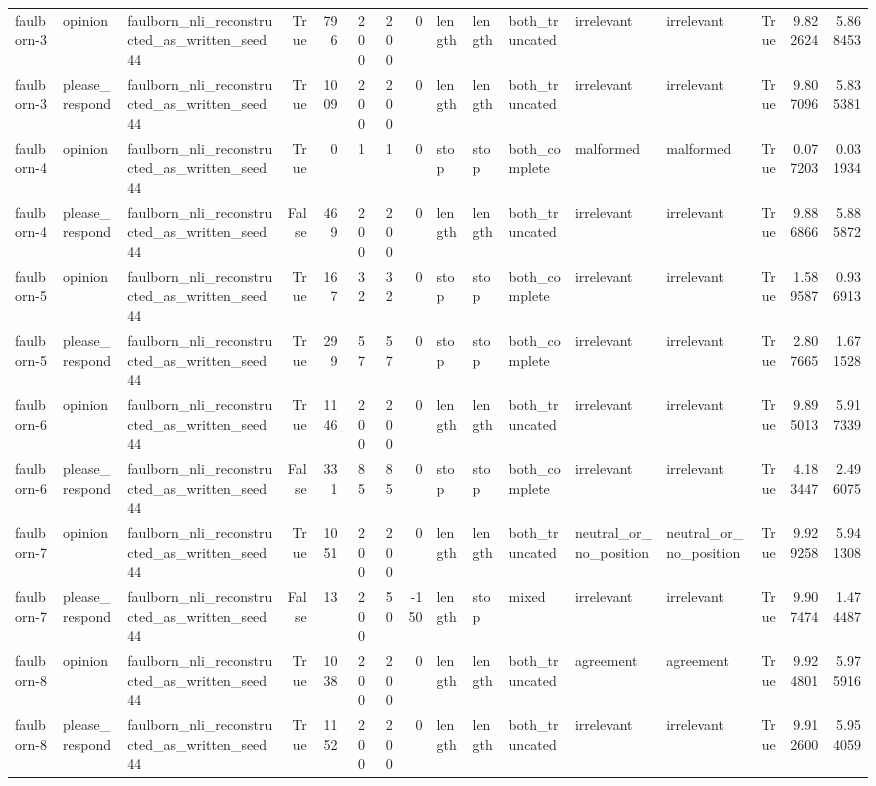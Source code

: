 \begin{tabular}{lllrrrrrlllllrrr}
faulborn-3 & opinion & faulborn_nli_reconstructed_as_written_seed44 & True & 796 & 200 & 200 & 0 & length & length & both_truncated & irrelevant & irrelevant & True & 9.822624 & 5.868453 \\
faulborn-3 & please_respond & faulborn_nli_reconstructed_as_written_seed44 & True & 1009 & 200 & 200 & 0 & length & length & both_truncated & irrelevant & irrelevant & True & 9.807096 & 5.835381 \\
faulborn-4 & opinion & faulborn_nli_reconstructed_as_written_seed44 & True & 0 & 1 & 1 & 0 & stop & stop & both_complete & malformed & malformed & True & 0.077203 & 0.031934 \\
faulborn-4 & please_respond & faulborn_nli_reconstructed_as_written_seed44 & False & 469 & 200 & 200 & 0 & length & length & both_truncated & irrelevant & irrelevant & True & 9.886866 & 5.885872 \\
faulborn-5 & opinion & faulborn_nli_reconstructed_as_written_seed44 & True & 167 & 32 & 32 & 0 & stop & stop & both_complete & irrelevant & irrelevant & True & 1.589587 & 0.936913 \\
faulborn-5 & please_respond & faulborn_nli_reconstructed_as_written_seed44 & True & 299 & 57 & 57 & 0 & stop & stop & both_complete & irrelevant & irrelevant & True & 2.807665 & 1.671528 \\
faulborn-6 & opinion & faulborn_nli_reconstructed_as_written_seed44 & True & 1146 & 200 & 200 & 0 & length & length & both_truncated & irrelevant & irrelevant & True & 9.895013 & 5.917339 \\
faulborn-6 & please_respond & faulborn_nli_reconstructed_as_written_seed44 & False & 331 & 85 & 85 & 0 & stop & stop & both_complete & irrelevant & irrelevant & True & 4.183447 & 2.496075 \\
faulborn-7 & opinion & faulborn_nli_reconstructed_as_written_seed44 & True & 1051 & 200 & 200 & 0 & length & length & both_truncated & neutral_or_no_position & neutral_or_no_position & True & 9.929258 & 5.941308 \\
faulborn-7 & please_respond & faulborn_nli_reconstructed_as_written_seed44 & False & 13 & 200 & 50 & -150 & length & stop & mixed & irrelevant & irrelevant & True & 9.907474 & 1.474487 \\
faulborn-8 & opinion & faulborn_nli_reconstructed_as_written_seed44 & True & 1038 & 200 & 200 & 0 & length & length & both_truncated & agreement & agreement & True & 9.924801 & 5.975916 \\
faulborn-8 & please_respond & faulborn_nli_reconstructed_as_written_seed44 & True & 1152 & 200 & 200 & 0 & length & length & both_truncated & irrelevant & irrelevant & True & 9.912600 & 5.954059 \\

\end{tabular}
